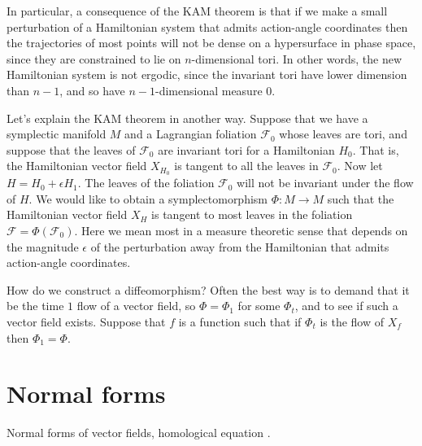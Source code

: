 \documentclass{article}
\begin{document}
In particular, a consequence of the KAM theorem is that if we make a small
perturbation of a Hamiltonian system that admits action-angle coordinates then
the trajectories of most points will not be dense on a hypersurface in phase space, since they
are constrained to lie on $n$-dimensional tori. In other words, the
new Hamiltonian system is not ergodic, since the invariant tori have lower
dimension than $n-1$, and so have $n-1$-dimensional measure 0.

Let's explain the KAM theorem in another way. Suppose that we have a 
symplectic manifold $M$ and a Lagrangian foliation $\mathscr{F}_0$ whose
leaves are tori, and suppose that the leaves of $\mathscr{F}_0$ are invariant
tori for a Hamiltonian $H_0$. That is,
the Hamiltonian vector field $X_{H_0}$ is tangent to all the leaves
in $\mathscr{F}_0$.
Now let $H=H_0+\epsilon H_1$. The leaves
of the foliation $\mathscr{F}_0$ will not be invariant under the flow 
of $H$. We would like to obtain a symplectomorphism $\Phi:M \to M$
such that the Hamiltonian vector field $X_H$ is tangent to most
leaves in the foliation $\mathscr{F}=\Phi(\mathscr{F}_0)$.
Here we mean most in a measure theoretic sense that depends on the magnitude
$\epsilon$ of the perturbation away from the Hamiltonian that admits action-angle
coordinates.

How do we construct a diffeomorphism? Often the best way is to demand
that it be the time $1$ flow of a vector field, so $\Phi=\Phi_1$ for
some $\Phi_t$, and to see if such a vector
field exists. Suppose that $f$ is a function such that if $\Phi_t$ is the flow of $X_f$ then $\Phi_1=\Phi$.
 

\section{Normal forms}
Normal forms of vector fields,
homological equation \cite{wiggins}.



\end{document}
